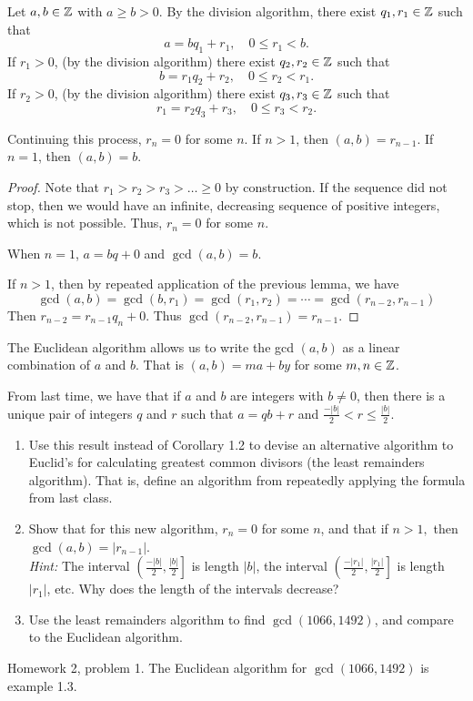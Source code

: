 \documentclass[letterpaper, 11 pt]{article}
\begin{document}
\begin{thm} 
Let $a,b\in\mathbb Z$ with $a\geq b>0$. By the division algorithm, there exist $q_1,r_1\in\mathbb Z$ such that 
\[a=b q_1+r_1,\quad 0\leq r_1<b.\]
If $r_1>0$, (by the division algorithm) there exist $q_2,r_2\in\mathbb Z$ such that 
\[b=r_1 q_2+r_2,\quad 0\leq r_2<r_1.\]
If $r_2>0$, (by the division algorithm) there exist $q_3,r_3\in\mathbb Z$ such that 
\[r_1=r_2 q_3+r_3,\quad 0\leq r_3<r_2.\]

Continuing this process, $r_n=0$ for some $n$. If $n>1$, then $(a,b)=r_{n-1}$. If $n=1$, then $(a,b)=b$.
\end{thm}
\begin{proof}
 Note that $r_1>r_2>r_3>\dots\geq0$ by construction. If the sequence did not stop, then we would have an infinite, decreasing sequence of positive integers, which is not possible. Thus, $r_n=0$ for some $n$. 
 
 When $n=1$, $a=bq+0$ and $\gcd(a,b)=b$.
 
 If $n>1$, then by repeated application of the previous lemma, we have 
 \[\gcd(a,b)=\gcd(b,r_1)=\gcd(r_1,r_2)=\cdots=\gcd(r_{n-2},r_{n-1})\]
 Then $r_{n-2}=r_{n-1} q_n+0$. Thus $\gcd(r_{n-2},r_{n-1})=r_{n-1}$.
\end{proof}

 The Euclidean algorithm allows us to write the gcd $(a,b)$ as a linear combination of $a$ and $b$. That is $(a,b)=ma+by$ for some $m,n\in\mathbb Z$.

\begin{br} From last time, we have that  if $a$ and $b$ are integers with $b\neq 0$, then there is a unique pair of integers $q$ and $r$ such that $a=qb+r$ and $\frac{-|b|}{2}<r\leq \frac{|b|}{2}$. 
	\begin{enumerate}
 				\item Use this result instead of Corollary 1.2 to devise an alternative algorithm to Euclid's for calculating greatest common divisors (the least remainders algorithm). That is, define an algorithm from repeatedly applying the formula from last class.
				\item  Show that for this new algorithm, $r_n=0$ for some $n$, and that if $n>1,$ then $\gcd(a,b)=|r_{n-1}|$. \\\emph{Hint:} The interval $\left(\frac{-|b|}{2},\frac{|b|}{2}\right]$ is length $|b|$, the interval $\left(\frac{-|r_1|}{2},\frac{|r_1|}{2}\right]$ is length $|r_1|$, etc. Why does the length of the intervals decrease? 
		\item Use the least remainders algorithm to find $\gcd(1066,1492)$, and compare to the Euclidean algorithm.
	\end{enumerate}
\end{br}
\begin{solution}
 Homework 2, problem 1. The Euclidean algorithm for $\gcd(1066,1492)$ is example 1.3.
\end{solution}
\end{document}
